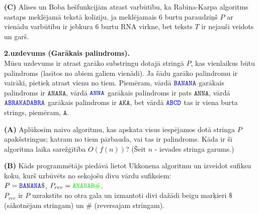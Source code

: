 \documentclass[a4paper,12pt]{article}
\begin{document}
\vspace{5pt}
{\bf (C)} Alises un Boba hešfunkcijām atrast varbūtību, ka 
Rabina-Karpa algoritms sastaps meklējamā tekstā kolīziju, ja meklējamais 
$6$ burtu paraudziņš $P$ ar vienādu varbūtību ir 
jebkura $6$ burtu RNA virkne, bet teksts $T$ ir nejauši veidots un garš. 






\vspace{20pt}
{\bf 2.uzdevums (Garākais palindroms).}\\

Mūsu uzdevums ir atrast garāko substringu do\-ta\-jā stringā $P$, kas vienlaikus būtu 
palindroms (lasītos no abiem galiem vienādi). Ja šādu garāko palindromu ir vairāki, 
pietiek atrast vienu no tiem.
Piemēram, vārdā $\textcolor{blue}{\mathtt{BANANA}}$ garākais palindroms ir $\mathtt{ANANA}$, 
vārdā $\textcolor{blue}{\mathtt{ANNA}}$ garākais palindroms ir pats $\mathtt{ANNA}$, 
vārdā $\textcolor{blue}{\mathtt{ABRAKADABRA}}$ garākais palindroms ir $\mathtt{AKA}$, 
bet vārdā  $\textcolor{blue}{\mathtt{ABCD}}$ tas ir viena burta strings, piemēram, $\mathtt{A}$.

\vspace{5pt}
{\bf (A)} Aplūkosim naivo algoritmu, kas apskata visus iespējamos dotā stringa $P$ apakšstringus; 
katram no tiem pārbauda, vai tas ir palindroms. 
Kāda ir šī algoritma laika sarežģītība $O(f(n))$? (Šeit $n$ - ievades stringa garums.)



\vspace{5pt}
{\bf (B)}
Kāds programmētājs piedāvā lietot Ukkonena algoritmu un izveidot sufiksu
koku, kurš uzbūvēts no sekojošu divu vārdu sufiksiem:\\
$P = \textcolor{blue}{\mathtt{BANANA\$}}$, 
$P_{rev} = \textcolor{green}{\mathtt{ANANAB\#}}$.\\
$P_{rev}$ ir $P$ uzrakstīts no otra gala un izmantoti divi dažādi beigu marķieri 
$\texttt{\$}$ (sākotnējam stringam) un $\texttt{\#}$ (reversajam stringam). 
\end{document}
